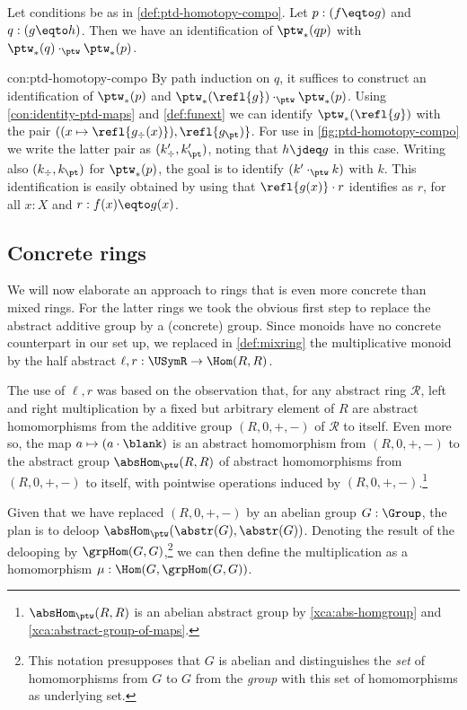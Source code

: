 \begin{construction}\label{con:ptd-homotopy-compo}
Let conditions be as in \cref{def:ptd-homotopy-compo}.
Let $p:(f\eqto g)$ and $q:(g\eqto h)$.
Then we have an identification of $\ptw_*(qp)$ with
$\ptw_*(q) \cdot_{\ptw} \ptw_*(p)$.
\end{construction}
\begin{implementation}{con:ptd-homotopy-compo}
By path induction on $q$, it suffices to construct an identification
of $\ptw_*(p)$ and $\ptw_*(\refl{g}) \cdot_{\ptw} \ptw_*(p)$.
Using \cref{con:identity-ptd-maps} and \cref{def:funext} we
can identify $\ptw_*(\refl{g})$ with the pair
$((x\mapsto\refl{g_\div(x)}),\refl{g_\pt)}$. 
For use in \cref{fig:ptd-homotopy-compo} we write the latter
pair as $(k'_\div,k'_\pt)$, noting that $h\jdeq g$ in this case.
Writing also $(k_\div,k_\pt)$ for $\ptw_*(p)$, the goal is to
identify $(k'\cdot_{\ptw} k)$ with $k$.
This identification is easily obtained by using
that $\refl{g(x)}\cdot r$ identifies as $r$,
for all $x:X$ and $r:f(x)\eqto g(x)$.
\end{implementation}

\subsection{Concrete rings}\label{sec:concrings}

We will now elaborate an approach to rings that is even more concrete
than mixed rings. For the latter rings we took the
obvious first step to replace the abstract additive group by a 
(concrete) group. Since monoids have no concrete counterpart in our set up,
we replaced in \cref{def:mixring} the multiplicative monoid 
by the half abstract $\ell,r:\USymR\to\Hom(R,R)$.

The use of $\ell,r$ was based on the observation that, 
for any abstract ring $\mathscr R$, left and right multiplication
by a fixed but arbitrary element of $R$ are 
abstract homomorphisms from the additive group $(R,0,+,-)$ of 
$\mathscr R$ to itself. 
Even more so, the map $a\mapsto(a\cdot\blank)$ is an abstract homomorphism
from $(R,0,+,-)$ to the abstract group $\absHom_{\ptw}(R,R)$
of abstract homomorphisms from $(R,0,+,-)$ to itself, with
pointwise operations induced by $(R,0,+,-)$.\footnote{%
$\absHom_{\ptw}(R,R)$ is an abelian abstract group by
\cref{xca:abs-homgroup} and \cref{xca:abstract-group-of-maps}.}

Given that we have replaced $(R,0,+,-)$ by an abelian group $G:\Group$,
the plan is to deloop $\absHom_{\ptw}(\abstr(G),\abstr(G))$. 
Denoting the result of the delooping by $\grpHom(G,G)$,\footnote{%
This notation presupposes that $G$ is abelian and distinguishes 
the \emph{set} of homomorphisms from $G$ to $G$ from the \emph{group}
with this set of homomorphisms as underlying set.}
we can then define the multiplication as a homomorphism
$\mu: \Hom(G,\grpHom(G,G))$.

